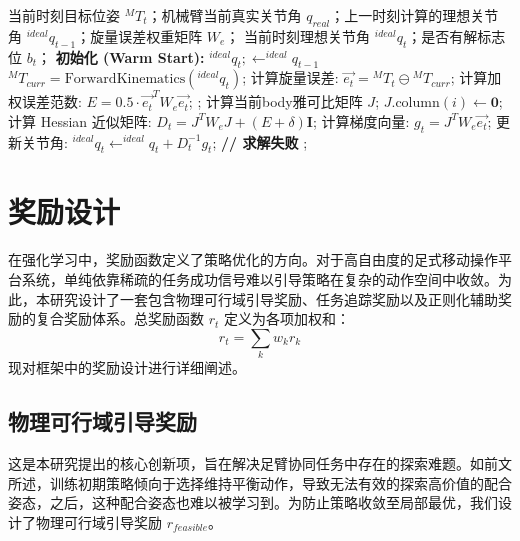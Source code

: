 \begin{algorithm}[!t]
    \caption{基于阻尼最小二乘的迭代逆运动学求解器}
    \label{alg:ik_solver}
    \begin{algorithmic}[1]
        \REQUIRE 当前时刻目标位姿 ${^MT}_{t}$；机械臂当前真实关节角 $q_{real}$；上一时刻计算的理想关节角 $^{ideal}q_{t-1}$；旋量误差权重矩阵 $W_{e}$；
        \ENSURE 当前时刻理想关节角 $^{ideal}q_{t}$；是否有解标志位 $b_{t}$；
        \STATE \textbf{初始化 (Warm Start):} $^{ideal}q_{t} ;\leftarrow ^{ideal}q_{t-1}$
        \STATE ${^MT}_{curr} = \text{ForwardKinematics}(^{ideal}q_{t})$;
        \STATE 计算旋量误差: $\vec{e_t} = {^MT}_{t} \ominus {^MT}_{curr}$;
        \STATE 计算加权误差范数: $E = 0.5 \cdot \vec{e_t}^T W_e \vec{e_t}$;
        ;
        \ENDIF
        \STATE 计算当前body雅可比矩阵 $J$;
        \STATE $J.\text{column}(i) \leftarrow \mathbf{0}$;
        \ENDIF
        \ENDFOR
        \STATE 计算 Hessian 近似矩阵: $D_t = J^T W_{e} J + (E + \delta)\mathbf{I}$;
        \STATE 计算梯度向量: $g_t = J^T W_{e} \vec{e_t}$;
        \STATE 更新关节角: $^{ideal}q_{t} \leftarrow ^{ideal}q_{t} + D_t^{-1} g_t$;
        \ENDFOR
        \STATE \textbf{// 求解失败}
        ;
    \end{algorithmic}
\end{algorithm}
\section{奖励设计}
\label{sec:reward_design}

在强化学习中，奖励函数定义了策略优化的方向。对于高自由度的足式移动操作平台系统，单纯依靠稀疏的任务成功信号难以引导策略在复杂的动作空间中收敛。为此，本研究设计了一套包含物理可行域引导奖励、任务追踪奖励以及正则化辅助奖励的复合奖励体系。总奖励函数 $r_t$ 定义为各项加权和：
\begin{equation}
    r_t = \sum_{k} w_k r_k
\end{equation}
现对框架中的奖励设计进行详细阐述。

\subsection{物理可行域引导奖励}
这是本研究提出的核心创新项，旨在解决足臂协同任务中存在的探索难题。如前文所述，训练初期策略倾向于选择维持平衡动作，导致无法有效的探索高价值的配合姿态，之后，这种配合姿态也难以被学习到。为防止策略收敛至局部最优，我们设计了物理可行域引导奖励 $r_{feasible}$。

